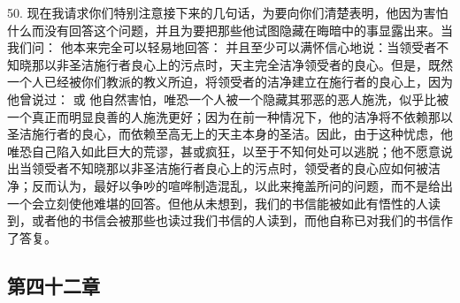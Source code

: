 50. 现在我请求你们特别注意接下来的几句话，为要向你们清楚表明，他因为害怕什么而没有回答这个问题，并且为要把那些他试图隐藏在晦暗中的事显露出来。当我们问： 他本来完全可以轻易地回答： 并且至少可以满怀信心地说：当领受者不知晓那以非圣洁施行者良心上的污点时，天主完全洁净领受者的良心。但是，既然一个人已经被你们教派的教义所迫，将领受者的洁净建立在施行者的良心上，因为他曾说过： 或  他自然害怕，唯恐一个人被一个隐藏其邪恶的恶人施洗，似乎比被一个真正而明显良善的人施洗更好；因为在前一种情况下，他的洁净将不依赖那以圣洁施行者的良心，而依赖至高无上的天主本身的圣洁。因此，由于这种忧虑，他唯恐自己陷入如此巨大的荒谬，甚或疯狂，以至于不知何处可以逃脱；他不愿意说出当领受者不知晓那以非圣洁施行者良心上的污点时，领受者的良心应如何被洁净；反而认为，最好以争吵的喧哗制造混乱，以此来掩盖所问的问题，而不是给出一个会立刻使他难堪的回答。但他从未想到，我们的书信能被如此有悟性的人读到，或者他的书信会被那些也读过我们书信的人读到，而他自称已对我们的书信作了答复。\par


\subsection{第四十二章}

